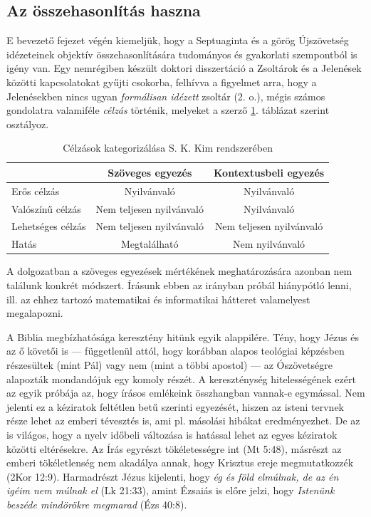 \documentclass{article}
\begin{document}
\subsection{Az összehasonlítás haszna}

E bevezető fejezet végén kiemeljük, hogy a Septuaginta és a görög Újszövetség idézeteinek
objektív összehasonlítására tudományos és gyakorlati szempontból is igény van. Egy nemrégiben
készült doktori disszertáció \cite{SungKukKim} a Zsoltárok és a Jelenések közötti
kapcsolatokat gyűjti csokorba, felhívva a figyelmet arra, hogy a Jelenésekben nincs ugyan
\textit{formálisan idézett} zsoltár (2. o.), mégis számos gondolatra valamiféle
\textit{célzás} történik, melyeket a szerző \ref{celzas}. táblázat szerint osztályoz.
\begin{table}
\begin{tabular}{l | c | c}
& Szöveges egyezés & Kontextusbeli egyezés \\
\hline
Erős célzás & Nyilvánvaló & Nyilvánvaló\\
Valószínű célzás & Nem teljesen nyilvánvaló & Nyilvánvaló\\
Lehetséges célzás & Nem teljesen nyilvánvaló & Nem teljesen nyilvánvaló\\
Hatás & Megtalálható & Nem nyilvánvaló
\end{tabular}
\caption{Célzások kategorizálása S. K. Kim rendszerében}
\label{celzas}
\end{table}
A dolgozatban a szöveges egyezések mértékének meghatározására azonban nem találunk konkrét módszert.
Írásunk ebben az irányban próbál hiánypótló lenni, ill. az ehhez tartozó matematikai
és informatikai hátteret valamelyest megalapozni.

A Biblia megbízhatósága keresztény hitünk egyik alappilére. Tény, hogy Jézus és az ő követői is ---
függetlenül attól, hogy korábban alapos teológiai képzésben részesültek (mint Pál) vagy nem
(mint a többi apostol) --- az Ószövetségre alapozták mondandójuk egy komoly részét.
A kereszténység hitelességének ezért az egyik próbája az, hogy írásos emlékeink összhangban
vannak-e egymással. Nem jelenti ez a kéziratok feltétlen betű szerinti egyezését, hiszen az isteni
tervnek része lehet az emberi tévesztés is, ami pl. másolási hibákat eredményezhet. De az is világos, hogy
a nyelv időbeli változása is hatással lehet az egyes kéziratok közötti eltérésekre. Az Írás
egyrészt tökéletességre int (Mt 5:48),
másrészt az emberi tökéletlenség nem akadálya annak, hogy Krisztus ereje megmutatkozzék
(2Kor 12:9). Harmadrészt Jézus kijelenti, hogy \textit{ég és föld elmúlnak, de az én igéim
nem múlnak el} (Lk 21:33), amint Ézsaiás is előre jelzi, hogy \textit{Istenünk beszéde
mindörökre megmarad} (Ézs 40:8).
\end{document}
